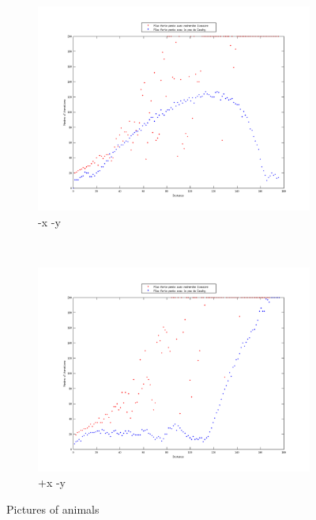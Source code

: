 \documentclass[11pt,a4paper,twoside,onecolumn,titlepage]{report}
\begin{document}
\begin{enumerate}[(a)]
\begin{figure}[h!]
	\begin{subfigure}[t]{0.5\textwidth}
		\centering
		\includegraphics[scale=0.4]{steps-quarter-1}
		\caption{-x -y}
		\label{fig:awesome_image}
	\end{subfigure}%
        ~ %
    \begin{subfigure}[t]{0.5\textwidth}
		\centering
		\includegraphics[scale=0.4]{steps-quarter-2}
		\caption{+x -y}
		\label{fig:awesome_image}
	\end{subfigure}
    \caption{Pictures of animals}\label{fig:steps-4}
\end{figure}



\end{enumerate}
\end{document}

